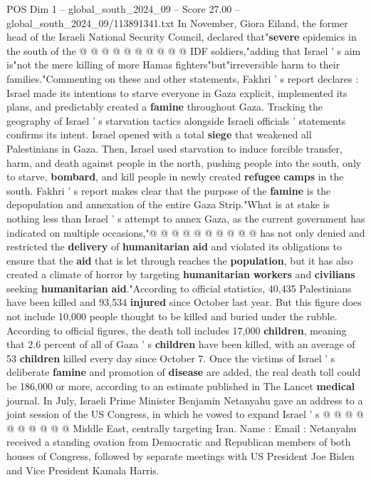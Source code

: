 \begin{textsample}{POS Dim 1 – global\_south\_2024\_09 – Score 27.00 – global\_south\_2024\_09/113891341.txt}
In November, Giora Eiland, the former head of the Israeli National Security Council, declared that"\textbf{severe} epidemics in the south of the @ @ @ @ @ @ @ @ @ @ IDF soldiers,"adding that Israel ' s aim is"not the mere killing of more Hamas fighters"but"irreversible harm to their families."Commenting on these and other statements, Fakhri ' s report declares : Israel made its intentions to starve everyone in Gaza explicit, implemented its plans, and predictably created a \textbf{famine} throughout Gaza.
Tracking the geography of Israel ' s starvation tactics alongside Israeli officials ' statements confirms its intent.
Israel opened with a total \textbf{siege} that weakened all Palestinians in Gaza.
Then, Israel used starvation to induce forcible transfer, harm, and death against people in the north, pushing people into the south, only to starve, \textbf{bombard}, and kill people in newly created \textbf{refugee} \textbf{camps} in the south.
Fakhri ' s report makes clear that the purpose of the \textbf{famine} is the depopulation and annexation of the entire Gaza Strip."What is at stake is nothing less than Israel ' s attempt to annex Gaza, as the current government has indicated on multiple occasions,"@ @ @ @ @ @ @ @ @ @ has not only denied and restricted the \textbf{delivery} of \textbf{humanitarian} \textbf{aid} and violated its obligations to ensure that the \textbf{aid} that is let through reaches the \textbf{population}, but it has also created a climate of horror by targeting \textbf{humanitarian} \textbf{workers} and \textbf{civilians} seeking \textbf{humanitarian} \textbf{aid}."According to official statistics, 40,435 Palestinians have been killed and 93,534 \textbf{injured} since October last year.
But this figure does not include 10,000 people thought to be killed and buried under the rubble.
According to official figures, the death toll includes 17,000 \textbf{children}, meaning that 2.6 percent of all of Gaza ' s \textbf{children} have been killed, with an average of 53 \textbf{children} killed every day since October 7.
Once the victims of Israel ' s deliberate \textbf{famine} and promotion of \textbf{disease} are added, the real death toll could be 186,000 or more, according to an estimate published in The Lancet \textbf{medical} journal.
In July, Israeli Prime Minister Benjamin Netanyahu gave an address to a joint session of the US Congress, in which he vowed to expand Israel ' s @ @ @ @ @ @ @ @ @ @ Middle East, centrally targeting Iran.
Name : Email : Netanyahu received a standing ovation from Democratic and Republican members of both houses of Congress, followed by separate meetings with US President Joe Biden and Vice President Kamala Harris.

\end{textsample}
